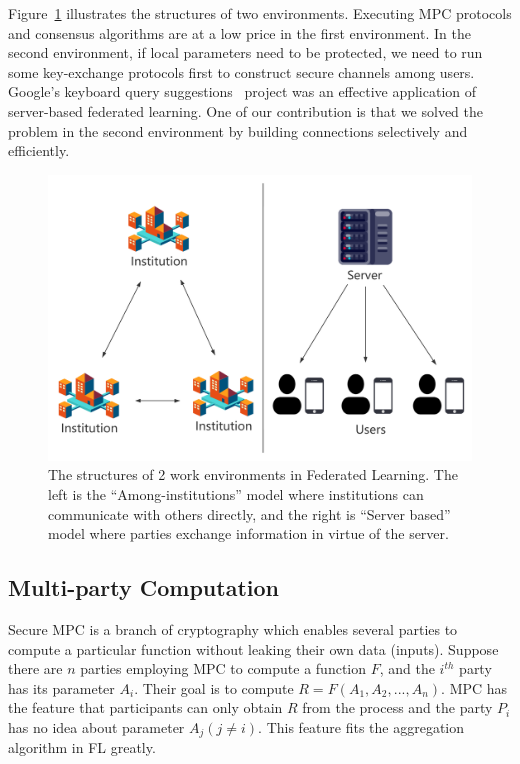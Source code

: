 Figure~\ref{fl_model} illustrates the structures of two environments. Executing MPC protocols and consensus algorithms are at a low price in the first environment. In the second environment, if local parameters need to be protected, we need to run some key-exchange protocols first to construct secure channels among users. Google's keyboard query suggestions~\cite{yang2018applied} project was an effective application of server-based federated learning. One of our contribution is that we solved the problem in the second environment by building connections selectively and efficiently.


\begin{figure}[!ht]
    \centering
    \includegraphics[width=\columnwidth]{img/fl_model.png}
    \caption{The structures of 2 work environments in Federated Learning. The left is the ``Among-institutions'' model where institutions can communicate with others directly, and the right is ``Server based'' model where parties exchange information in virtue of the server.}
    \label{fl_model}
\end{figure}


\subsection{Multi-party Computation}
Secure MPC is a branch of cryptography which enables several parties to compute a particular function without leaking their own data (inputs). Suppose there are $n$ parties employing MPC to compute a function $F$, and the $i^{th}$ party has its parameter $A_i$. Their goal is to compute $R = F(A_1, A_2, ..., A_n)$. MPC has the feature that participants can only obtain $R$ from the process and the party $P_i$ has no idea about parameter $A_j (j \ne i)$. This feature fits the aggregation algorithm in FL greatly.

